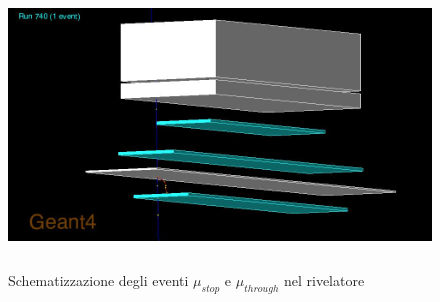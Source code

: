 \documentclass[12pt,a4paper]{report}
\begin{document}
\begin{figure}[h]
	\centering
  \includegraphics[width=13cm, height=7.5cm]{images/mu_stop.jpg}
	\caption{Schematizzazione degli eventi $\mu_{stop}$ e $\mu_{through}$ nel rivelatore}
\end{figure}
\end{document}
